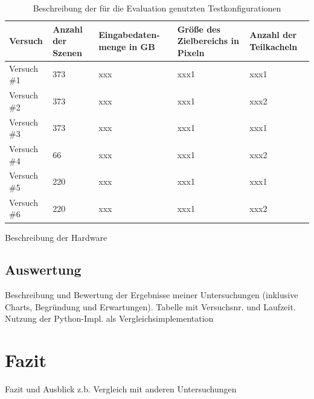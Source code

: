 \begin{table}[position specifier]
          \centering
          \begin{tabular}{| p{3cm} | p{2cm} | p{2cm} | p{2cm} | p{2cm} |}
          	\hline
                  Versuch & Anzahl der Szenen & Eingabedaten- menge in GB & Größe des Zielbereichs in Pixeln & Anzahl der Teilkacheln \\
                  \hline
                  Versuch \#1 & 373 & xxx & xxx1 & xxx1 \\
                  \hline
                  Versuch \#2 & 373 & xxx & xxx1 & xxx2 \\
                  \hline
                  Versuch \#3 & 373 & xxx & xxx1 & xxx1 \\
                  \hline
                  Versuch \#4 & 66 & xxx & xxx1 & xxx2 \\
                  \hline
                  Versuch \#5 & 220 & xxx & xxx1 & xxx1 \\
                  \hline
                  Versuch \#6 & 220 & xxx & xxx1 & xxx2 \\
                  \hline

          \end{tabular}
          \caption{Beschreibung der für die Evaluation genutzten Testkonfigurationen}
          \label{tab:descriptionTestSetting}
\end{table}

Beschreibung der Hardware

\section{Auswertung}
Beschreibung und Bewertung der Ergebnisse meiner Untersuchungen (inklusive Charts, Begründung und Erwartungen). Tabelle mit Versuchsnr. und  Laufzeit. Nutzung der Python-Impl. als Vergleichsimplementation

\chapter{Fazit}
Fazit und Ausblick
z.b. Vergleich mit anderen Untersuchungen

